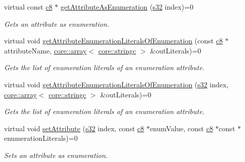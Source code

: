 \begin{DoxyCompactItemize}
virtual const \hyperlink{namespaceirr_a9395eaea339bcb546b319e9c96bf7410}{c8} $\ast$ \hyperlink{classirr_1_1io_1_1IAttributes_a195cd7ee6a50a6a10d22a874072a93c9}{get\+Attribute\+As\+Enumeration} (\hyperlink{namespaceirr_ac66849b7a6ed16e30ebede579f9b47c6}{s32} index)=0
\begin{DoxyCompactList}\small\item\em Gets an attribute as enumeration. \end{DoxyCompactList}\item 
virtual void \hyperlink{classirr_1_1io_1_1IAttributes_a74980af4d5297b74670f55711e25fd79}{get\+Attribute\+Enumeration\+Literals\+Of\+Enumeration} (const \hyperlink{namespaceirr_a9395eaea339bcb546b319e9c96bf7410}{c8} $\ast$attribute\+Name, \hyperlink{classirr_1_1core_1_1array}{core\+::array}$<$ \hyperlink{namespaceirr_1_1core_ade1071a878633f2f6d8a75c5d11fec19}{core\+::stringc} $>$ \&out\+Literals)=0
\begin{DoxyCompactList}\small\item\em Gets the list of enumeration literals of an enumeration attribute. \end{DoxyCompactList}\item 
virtual void \hyperlink{classirr_1_1io_1_1IAttributes_ae5d5d0c42a5a0199baf12abe971cb610}{get\+Attribute\+Enumeration\+Literals\+Of\+Enumeration} (\hyperlink{namespaceirr_ac66849b7a6ed16e30ebede579f9b47c6}{s32} index, \hyperlink{classirr_1_1core_1_1array}{core\+::array}$<$ \hyperlink{namespaceirr_1_1core_ade1071a878633f2f6d8a75c5d11fec19}{core\+::stringc} $>$ \&out\+Literals)=0
\begin{DoxyCompactList}\small\item\em Gets the list of enumeration literals of an enumeration attribute. \end{DoxyCompactList}\item 
\mbox{\label{classirr_1_1io_1_1IAttributes_a90962800fc16f01aa90e88a83188449b}} 
virtual void \hyperlink{classirr_1_1io_1_1IAttributes_a90962800fc16f01aa90e88a83188449b}{set\+Attribute} (\hyperlink{namespaceirr_ac66849b7a6ed16e30ebede579f9b47c6}{s32} index, const \hyperlink{namespaceirr_a9395eaea339bcb546b319e9c96bf7410}{c8} $\ast$enum\+Value, const \hyperlink{namespaceirr_a9395eaea339bcb546b319e9c96bf7410}{c8} $\ast$const $\ast$enumeration\+Literals)=0
\begin{DoxyCompactList}\small\item\em Sets an attribute as enumeration. \end{DoxyCompactList}\item 

\end{DoxyCompactItemize}
